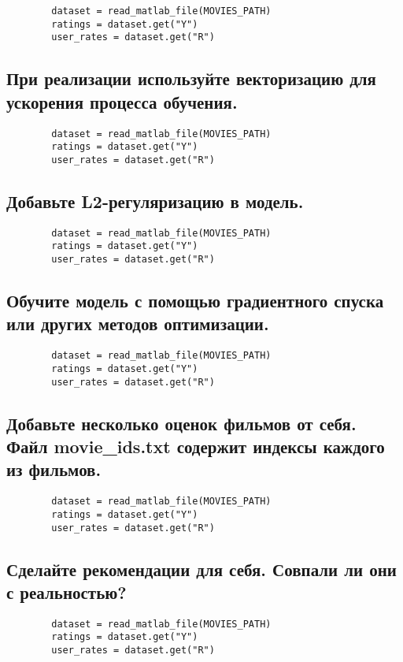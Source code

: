 \begin{lstlisting}
        dataset = read_matlab_file(MOVIES_PATH)
        ratings = dataset.get("Y")
        user_rates = dataset.get("R")
\end{lstlisting}

\subsection{При реализации используйте векторизацию для ускорения процесса обучения.}

\begin{lstlisting}
        dataset = read_matlab_file(MOVIES_PATH)
        ratings = dataset.get("Y")
        user_rates = dataset.get("R")
\end{lstlisting}

\subsection{Добавьте L2-регуляризацию в модель.}

\begin{lstlisting}
        dataset = read_matlab_file(MOVIES_PATH)
        ratings = dataset.get("Y")
        user_rates = dataset.get("R")
\end{lstlisting}

\subsection{Обучите модель с помощью градиентного спуска или других методов оптимизации.}

\begin{lstlisting}
        dataset = read_matlab_file(MOVIES_PATH)
        ratings = dataset.get("Y")
        user_rates = dataset.get("R")
\end{lstlisting}

\subsection{Добавьте несколько оценок фильмов от себя. Файл movie_ids.txt содержит индексы каждого из фильмов.}

\begin{lstlisting}
        dataset = read_matlab_file(MOVIES_PATH)
        ratings = dataset.get("Y")
        user_rates = dataset.get("R")
\end{lstlisting}

\subsection{Сделайте рекомендации для себя. Совпали ли они с реальностью?}

\begin{lstlisting}
        dataset = read_matlab_file(MOVIES_PATH)
        ratings = dataset.get("Y")
        user_rates = dataset.get("R")
\end{lstlisting}


